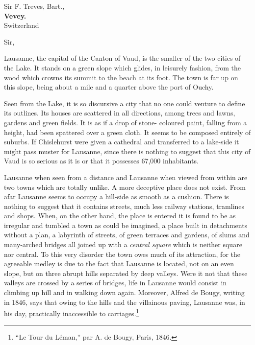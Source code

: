 \documentclass[10pt,english]{hletter}
\begin{document}
\signature{Dr.~C. Featherstonehaugh & Dr.~A. Beauchamp \\ CEO & CIO}


\date{Lausanne, le 15 septembre 2008}

\begin{letter}{Sir F. Treves, Bart.,\\
               \textbf{Vevey.}\\
               Switzerland}

\opening[\textsc{[draft]}]{Sir,}


Lausanne, the capital of the Canton of Vaud, is the smaller of the two
cities of the Lake. It stands on a green slope which glides, in
leisurely fashion, from the wood which crowns its summit to the beach
at its foot. The town is far up on this slope, being about a mile and a
quarter above the port of Ouchy.

Seen from the Lake, it is so discursive a city that no one could
venture to define its outlines. Its houses are scattered in all
directions, among trees and lawns, gardens and green fields. It is as
if a drop of stone- coloured paint, falling from a height, had been
spattered over a green cloth. It seems to be composed entirely of
suburbs. If Chislehurst were given a cathedral and transferred to a
lake-side it might pass muster for Lausanne, since there is nothing to
suggest that this city of Vaud is so serious as it is or that it
possesses 67,000 inhabitants.

Lausanne when seen from a distance and Lausanne when viewed from within
are two towns which are totally unlike. A more deceptive place does not
exist. From afar Lausanne seems to occupy a hill-side as smooth as a
cushion. There is nothing to suggest that it contains streets, much
less railway stations, tramlines and shops. When, on the other hand,
the place is entered it is found to be as irregular and tumbled a town
as could be imagined, a place built in detachments without a plan, a
labyrinth of streets, of green terraces and gardens, of slums and
many-arched bridges all joined up with a \emph{central square} which is
neither square nor central. To this very disorder the town owes much of
its attraction, for the agreeable medley is due to the fact that
Lausanne is located, not on an even slope, but on three abrupt hills
separated by deep valleys. Were it not that these valleys are crossed
by a series of bridges, life in Lausanne would consist in climbing up
hill and in walking down again. Moreover, Alfred de Bougy, writing in
1846, says that owing to the hills and the villainous paving, Lausanne
was, in his day, practically inaccessible to carriages.\footnote{``Le
Tour du L\'{e}man,'' par A. de Bougy, Paris, 1846.}


\end{letter}
\end{document}
